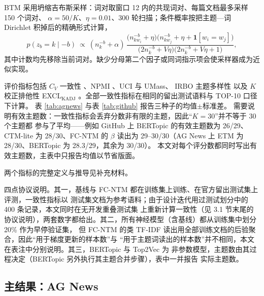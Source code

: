 \documentclass[11pt]{ctexart}
\newcommand{\fcntm}{FC-NTM}
\begin{document}
BTM 采用坍缩吉布斯采样：词对取窗口 12 内的共现词对、每篇文档最多采样 150 个词对、
$\alpha=50/K$、$\eta=0.01$、300 轮扫描；条件概率按把主题—词 Dirichlet 积掉后的精确形式计算，
\begin{equation}
p(z_b=k\mid -b)\ \propto\
(n_k^{-b}+\alpha)\,
\frac{\big(n_{kw_i}^{-b}+\eta\big)\big(n_{kw_j}^{-b}+\eta+\mathbf 1[w_i=w_j]\big)}
{\big(2n_k^{-b}+V\eta\big)\big(2n_k^{-b}+V\eta+1\big)} ,
\label{eq:btmcond}
\end{equation}
其中计数均先移除当前词对。缺少分母第二个因子或同词指示项会使采样器成为近似实现。

评价指标包括 $C_V$ 一致性 \cite{roder2015coherence}、NPMI \cite{bouma2009npmi,lau2014tea}、UCI 与 UMass、
IRBO 主题多样性 \cite{webber2010rbo} 以及 $K$ 校正排他性 EXCL$_{\mathrm{KADJ}}$
\cite{bischof2012exclusivity}。全部一致性指标在相同的留出测试语料与 TOP-10 口径下计算。
表 \ref{tab:agnews} 与表 \ref{tab:github} 报告三种子的均值$\pm$标准差。
需要说明有效主题数：一致性指标会丢弃分数非有限的主题，因此“$K=30$”并不等于 30 个主题都
参与了平均——例如 GitHub 上 BERTopic 的有效主题数为 26/29、CTM-lite 为 28/30、\fcntm{} 的
$\beta$ 读出为 29--30/30（AG News 上 ETM 为 28/30、BERTopic 为 28.3/29，其余为 30/30）。
本文对每个评分数都同时写出有效主题数，主表中只报告均值以节省版面。

两个指标的完整定义与推导见补充材料。

四点协议说明。其一，基线与 \fcntm{} 都在训练集上训练、在官方留出测试集上评测，一致性指标以
测试集文档为参考语料；由于设计迭代用过测试划分中的 400 条记录，本文同时在无开发重叠测试集
上重新计算一致性（见 3.1 节末尾的协议说明），两套数字都给出。其二，所有神经模型（含基线）都从训练集中划分 20\% 作为早停验证集，
但 \fcntm{} 的类 TF-IDF 读出用全部训练文档的后验聚合，因此“用于梯度更新的样本数”与
“用于主题词读出的样本数”并不相同，本文在表注中分别说明。其三，BERTopic 与 Top2Vec 为
非参数模型，主题数由其过程决定（BERTopic 另外执行其主题合并步骤），表中一并报告
实际主题数。

\subsection{主结果：AG News}
\label{sec:main-agnews}
\end{document}
